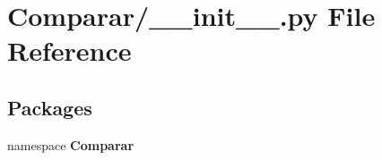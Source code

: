 \section{\-Comparar/\-\_\-\-\_\-init\-\_\-\-\_\-.py \-File \-Reference}
\label{_comparar_2____init_____8py}
\subsection*{\-Packages}
\begin{DoxyCompactItemize}
\item 
namespace {\bf \-Comparar}
\end{DoxyCompactItemize}
